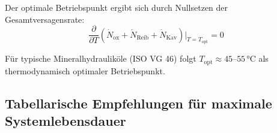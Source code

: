 ﻿\documentclass[a4paper,12pt]{scrreprt}
\theoremstyle{definition}
\begin{document}
Der optimale Betriebspunkt ergibt sich durch Nullsetzen der Gesamtversagensrate:
\begin{equation}
  \frac{\partial}{\partial T}\!\left(\dot{N}_{\mathrm{ox}} + \dot{N}_{\mathrm{Reib}}
    + \dot{N}_{\mathrm{Kav}}\right)\bigg|_{T = T_{\mathrm{opt}}} = 0
  \label{eq:opt_temp}
\end{equation}

Für typische Mineralhydrauliköle (ISO VG 46) folgt $T_{\mathrm{opt}} \approx 45$--$55\, °\mathrm{C}$
als thermodynamisch optimaler Betriebspunkt.

\subsection{Tabellarische Empfehlungen für maximale Systemlebensdauer}
\end{document}
